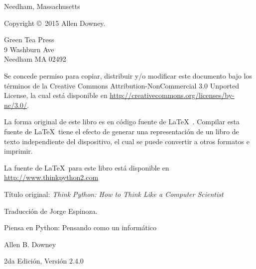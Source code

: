 \documentclass[10pt]{book}
\newcommand{\thetitle}{Piensa en Python: Pensando como un informático}
\newcommand{\theversion}{2da Edición, Versión 2.4.0}
\newcommand{\thedate}{}
\begin{document}
\begin{latexonly}
\begin{flushright}
{\small Needham, Massachusetts}

\vfill

\end{flushright}


\pagebreak
\thispagestyle{empty}

{\small
Copyright \copyright ~2015 Allen Downey.


\vspace{0.2in}

\begin{flushleft}
Green Tea Press       \\
9 Washburn Ave        \\
Needham MA 02492
\end{flushleft}

Se concede permiso para copiar, distribuir y/o modificar este documento
bajo los términos de la Creative Commons Attribution-NonCommercial
3.0 Unported License, la cual está disponible en \url{http://creativecommons.org/licenses/by-nc/3.0/}.

La forma original de este libro es en código fuente de \LaTeX\ .  Compilar esta
fuente de \LaTeX\ tiene el efecto de generar una representación de un libro de texto
independiente del dispositivo, el cual se puede convertir a otros formatos
e imprimir.

La fuente de \LaTeX\ para este libro está disponible en
\url{http://www.thinkpython2.com}

Título original: {\em Think Python: How to Think Like a Computer Scientist}

Traducción de Jorge Espinoza.

\vspace{0.2in}

} %

\end{latexonly}



\begin{htmlonly}


{\Large \thetitle}

{\large Allen B. Downey}

\theversion

\thedate

\setcounter{chapter}{-1}

\end{htmlonly}
\end{document}
